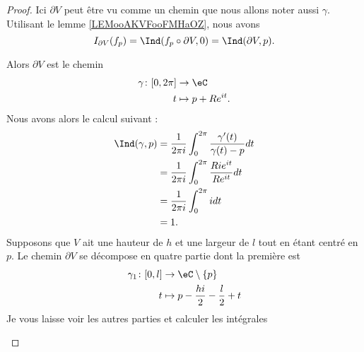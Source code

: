 \begin{proof}
	Ici \( \partial V\) peut être vu comme un chemin que nous allons noter aussi \( \gamma\). Utilisant le lemme \ref{LEMooAKVFooFMHaOZ}, nous avons
	\begin{equation}        \label{EQooRSXRooTJwDNP}
		I_{\partial V}(f_p)=\Ind(f_p\circ\partial V,0)=\Ind(\partial V,p).
	\end{equation}

	\begin{subproof}
		Alors \( \partial V\) est le chemin
		\begin{equation}
			\begin{aligned}
				\gamma\colon \mathopen[ 0 , 2\pi \mathclose] & \to \eC             \\
				t                                            & \mapsto p+R e^{it}.
			\end{aligned}
		\end{equation}
		Nous avons alors le calcul suivant :
		\begin{subequations}
			\begin{align}
				\Ind(\gamma,p) & =\frac{1}{ 2\pi i }\int_0^{2\pi}\frac{ \gamma'(t) }{ \gamma(t)-p }dt \\
				               & =\frac{1}{ 2\pi i }\int_0^{2\pi}\frac{ Ri e^{it} }{ R e^{it} }dt     \\
				               & =\frac{1}{ 2\pi i }\int_0^{2\pi}idt                                  \\
				               & =1.
			\end{align}
		\end{subequations}
		Supposons que \( V\) ait une hauteur de \( h\) et une largeur de \( l\) tout en étant centré en \( p\). Le chemin \( \partial V\) se décompose en quatre partie dont la première est
		\begin{equation}
			\begin{aligned}
				\gamma_1\colon \mathopen[ 0 , l \mathclose] & \to \eC\setminus \{ p \}                   \\
				t                                           & \mapsto p-\frac{ hi }{ 2 }-\frac{ l }{2}+t
			\end{aligned}
		\end{equation}
		Je vous laisse voir les autres parties et calculer les intégrales


\end{subproof}
\end{proof}
